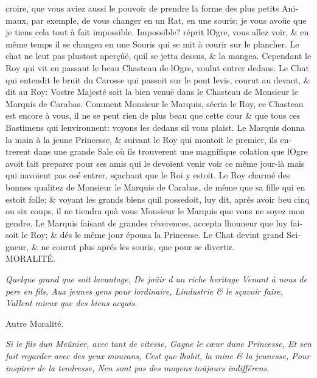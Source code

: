\documentclass[14pt,a4paper]{memoir}
\begin{document}
\begin{otherlanguage}{french}
croire, que vous aviez aussi le pouvoir de prendre la forme des plus
petits Animaux, par exemple, de vous changer en un Rat, en une souris;
je vous avoüe que je tiens cela tout à fait impossible. Impossible?
réprit l\textquotesingle Ogre, vous allez voir, \& en même temps il se
changea en une Souris qui se mit à courir sur le plancher. Le chat ne
l\textquotesingle eut pas plustost aperçûë, qu\textquotesingle il se
jetta dessus, \& la mangea. Cependant le Roy qui vit en passant le beau
Chasteau de l\textquotesingle Ogre, voulut entrer dedans. Le Chat qui
entendit le bruit du Carosse qui passoit sur le pont levis, courut au
devant, \& dit au Roy: Vostre Majesté soit la bien venuë dans le
Chasteau de Monsieur le Marquis de Carabas. Comment Monsieur le Marquis,
s\textquotesingle écria le Roy, ce Chasteau est encore à vous, il ne se
peut rien de plus beau que cette cour \& que tous ces Bastimens qui
l\textquotesingle environnent: voyons les dedans s\textquotesingle il
vous plaist. Le Marquis donna la main à la jeune Princesse, \& suivant
le Roy qui montoit le premier, ils entrerent dans une grande Sale où ils
trouverent une magnifique colation que l\textquotesingle Ogre avoit fait
preparer pour ses amis qui le devoient venir voir ce même jour-là mais
qui n\textquotesingle avoient pas osé entrer, sçachant que le Roi y
estoit. Le Roy charmé des bonnes qualitez de Monsieur le Marquis de
Carabas, de même que sa fille qui en estoit folle; \& voyant les grands
biens qu\textquotesingle il possedoit, luy dit, aprés avoir beu cinq ou
six coups, il ne tiendra qu\textquotesingle à vous Monsieur le Marquis
que vous ne soyez mon gendre. Le Marquis faisant de grandes réverences,
accepta l\textquotesingle honneur que luy faisoit le Roy; \& dés le même
jour épousa la Princesse. Le Chat devint grand Seigneur, \& ne courut
plus aprés les souris, que pour se divertir. \\

MORALITÉ.

\emph{{Quelque grand que soit l\textquotesingle avantage,} {De joüir d
un riche heritage} {Venant à nous de pere en fils,} {Aux jeunes gens
pour l\textquotesingle ordinaire,} {L\textquotesingle industrie \& le
sçavoir faire,} {Vallent mieux que des biens acquis.}}

Autre Moralité.

\emph{{Si le fils d\textquotesingle un Meûnier, avec tant de vitesse, }
{Gagne le cœur d\textquotesingle une Princesse,} {Et
s\textquotesingle en fait regarder avec des yeux mourans,}
{C\textquotesingle est que l\textquotesingle habit, la mine \& la
jeunesse,} {Pour inspirer de la tendresse,} {N\textquotesingle en sont
pas des moyens toûjours indifférens.}}


\end{otherlanguage}
\end{document}
